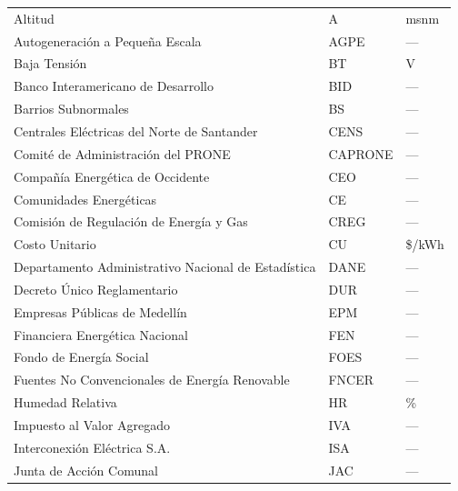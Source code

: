 \begin{longtable}{p{8.5cm} p{3cm} p{2cm}}
Altitud                                                   & A        & msnm      \\
Autogeneración a Pequeña Escala                           & AGPE     & ---       \\
Baja Tensión                                              & BT       & V         \\
Banco Interamericano de Desarrollo                        & BID      & ---       \\
Barrios Subnormales                                       & BS       & ---       \\
Centrales Eléctricas del Norte de Santander               & CENS     & ---       \\
Comité de Administración del PRONE                        & CAPRONE  & ---       \\
Compañía Energética de Occidente                          & CEO      & ---       \\
Comunidades Energéticas                                   & CE       & ---       \\
Comisión de Regulación de Energía y Gas                   & CREG     & ---       \\
Costo Unitario                                            & CU       & \$/kWh    \\
Departamento Administrativo Nacional de Estadística       & DANE     & ---       \\
Decreto Único Reglamentario                               & DUR      & ---       \\
Empresas Públicas de Medellín                             & EPM      & ---       \\
Financiera Energética Nacional                            & FEN      & ---       \\
Fondo de Energía Social                                   & FOES     & ---       \\
Fuentes No Convencionales de Energía Renovable            & FNCER    & ---       \\
Humedad Relativa                                          & HR       & \%        \\
Impuesto al Valor Agregado                                & IVA      & ---       \\
Interconexión Eléctrica S.A.                              & ISA      & ---       \\
Junta de Acción Comunal                                   & JAC      & ---       \\

\end{longtable}
